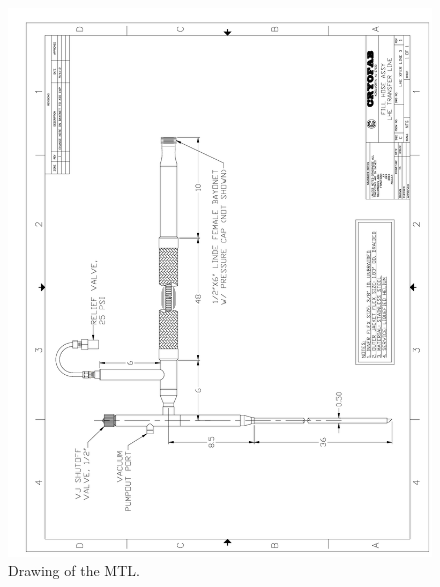 \begin{appendices}
\begin{figure}[tbp!]
 \centering
 \includegraphics[width=\textwidth]{./img/MTL-drawing.png}
 \caption{Drawing of the MTL.}
 \label{fig:MTL-drawing}
\end{figure}


\end{appendices}

